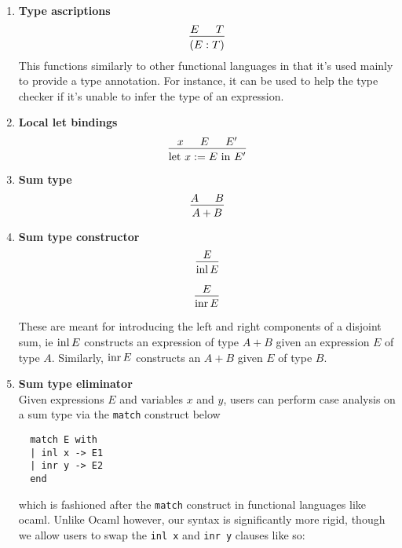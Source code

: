 \documentclass{article}
\begin{document}
\begin{enumerate}
\item \textbf{Type ascriptions} \\
  \[
    \begin{prooftree}
      \hypo{E}
      \hypo{T}
      \infer2{(E : T)}
    \end{prooftree}
  \]
  This functions similarly to other functional languages in that it's used
  mainly to provide a type annotation. For instance, it can be used to help the
  type checker if it's unable to infer the type of an expression.

\item \textbf{Local let bindings} \\
\[
  \begin{prooftree}
    \hypo{x}
    \hypo{E}
    \hypo{E'}
    \infer3{\text{let } x := E \text{ in } E'}
  \end{prooftree}
\]

\item \textbf{Sum type} \\
\[
  \begin{prooftree}
    \hypo{A}
    \hypo{B}
    \infer2{A + B}
  \end{prooftree}
\]

\item \textbf{Sum type constructor} \\
\[
  \begin{prooftree}
    \hypo{E}
    \infer1{\inl E}
  \end{prooftree}
\]

\[
  \begin{prooftree}
    \hypo{E}
    \infer1{\inr E}
  \end{prooftree}
\]

These are meant for introducing the left and right components of a disjoint sum,
ie $\operatorname{inl} E$ constructs an expression of type $A + B$ given an expression $E$ of
type $A$. Similarly, $\operatorname{inr} E$ constructs an $A + B$ given $E$ of type $B$.

\item \textbf{Sum type eliminator} \\
Given expressions $E$ and variables $x$ and $y$, users can perform case analysis
on a sum type via the \verb|match| construct below

\begin{verbatim}
  match E with
  | inl x -> E1
  | inr y -> E2
  end
\end{verbatim}

which is fashioned after the \verb|match| construct in functional languages like
ocaml. Unlike Ocaml however, our syntax is significantly more rigid, though we
allow users to swap the \verb|inl x| and \verb|inr y| clauses like so:


\end{enumerate}
\end{document}
